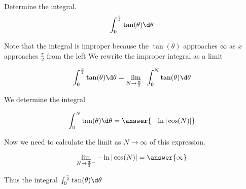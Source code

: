 \documentclass{ximera}
\author{Jason Miller}
\begin{document}
\begin{exercise}
Determine the integral.
\[
\int_{0}^{\frac{\pi}{2}} \tan(\theta) \d \theta 
\]

Note that the integral is improper because the $\tan(\theta)$ approaches $\infty$ as $x$ approaches $\frac{\pi}{2}$ from the left
We  rewrite the improper integral as a limit

\[
\int_{0}^{\frac{\pi}{2}} \tan(\theta) \d \theta=\lim_{N \to {\frac{\pi}{2}}^{-}} \int_{0}^{N} \tan(\theta) \d \theta
\]

We determine the integral

\[
\int_{0}^{N} \tan(\theta) \d \theta= \answer{-\ln|\cos(N)| }
\]


\begin{exercise}
Now we need to calculate the limit as $N \to \infty$ of this expression. 

\[
\lim_{N \to {\frac{\pi}{2}}^{-}} -\ln| \cos(N) |= \answer{  \infty }
\]

\begin{exercise}
Thus the integral $\int_{0}^{\frac{\pi}{2}} \tan(\theta) \d \theta$ 

\begin{multipleChoice}
\end{multipleChoice}




\end{exercise}
\end{exercise}
\end{exercise}
\end{document}
